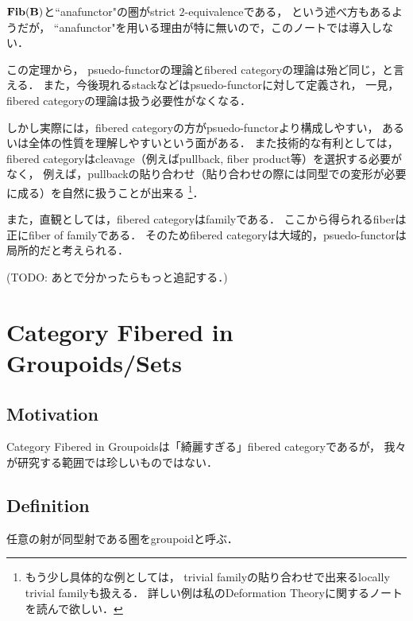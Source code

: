     \begin{Remark}
        $\mathbf{Fib}(\mathbf{B})$と``anafunctor"の圏がstrict $2$-equivalenceである，
        という述べ方もあるようだが，
        ``anafunctor"を用いる理由が特に無いので，このノートでは導入しない．
    \end{Remark}

    \begin{Remark}
        この定理から，
        psuedo-functorの理論とfibered categoryの理論は殆ど同じ，と言える．
        また，今後現れるstackなどはpsuedo-functorに対して定義され，
        一見，fibered categoryの理論は扱う必要性がなくなる．
        
        しかし実際には，fibered categoryの方がpsuedo-functorより構成しやすい，
        あるいは全体の性質を理解しやすいという面がある．
        また技術的な有利としては，
        fibered categoryはcleavage（例えばpullback, fiber product等）を選択する必要がなく，
        例えば，pullbackの貼り合わせ（貼り合わせの際には同型での変形が必要に成る）を自然に扱うことが出来る
        \footnote
        {
            もう少し具体的な例としては，
            trivial familyの貼り合わせで出来るlocally trivial familyも扱える．
            詳しい例は私のDeformation Theoryに関するノートを読んで欲しい．
        }．
        
        また，直観としては，fibered categoryはfamilyである．
        ここから得られるfiberは正にfiber of familyである．
        そのためfibered categoryは大域的，psuedo-functorは局所的だと考えられる．

        (TODO: あとで分かったらもっと追記する．)
    \end{Remark}

\section{Category Fibered in Groupoids/Sets}
\subsection{Motivation}
    Category Fibered in Groupoidsは「綺麗すぎる」fibered categoryであるが，
    我々が研究する範囲では珍しいものではない．
    

\subsection{Definition}
    \begin{Def}[Groupoid]
        任意の射が同型射である圏をgroupoidと呼ぶ．
    \end{Def}

